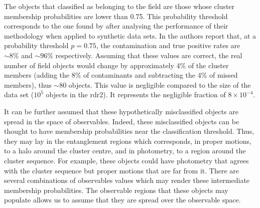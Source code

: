 The objects that \citet{Bouy2015} classified as belonging to the field are those whose cluster membership probabilities are lower than 0.75. This probability threshold corresponds to the one found by \citet{Sarro2014} after analysing the performance of their methodology when applied to synthetic data sets. In \citet{Sarro2014} the authors report that, at a probability threshold $p=0.75$, the contamination and true positive rates are $\sim 8\%$ and $ \sim96\%$ respectively. Assuming that these values are correct, the real number of field objects would change by approximately 4\% of the cluster members (adding the 8\% of contaminants and subtracting the 4\% of missed members), thus $\sim 80$ objects. This value is negligible compared to the size of the data set ($10^5$ objects in the \gls{rdr2}). It represents the negligible fraction of $ 8\times10^{-4}$. 

It can be further assumed that these hypothetically misclassified objects are spread in the space of observables. Indeed, these misclassified objects can be thought to have membership probabilities near the classification threshold. Thus, they may lay in the entanglement regions which corresponds, in proper motions, to a halo around the cluster centre, and in photometry, to a region around the cluster sequence. For example, these objects could have photometry that agrees with the cluster sequence but proper motions that are far from it. There are several combinations of observables values which may render these intermediate membership probabilities. The observable regions that these objects may populate allows us to assume that they are spread over the observable space. 


